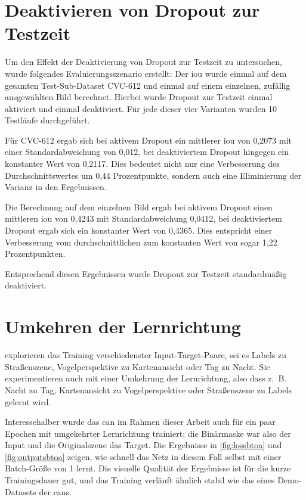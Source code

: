 \section{Deaktivieren von Dropout zur Testzeit}

Um den Effekt der Deaktivierung von Dropout zur Testzeit zu untersuchen, wurde folgendes Evaluierungsszenario erstellt:
Der \gls{iou} wurde einmal auf dem gesamten Test-Sub-Dataset CVC-612 und einmal auf einem einzelnen, zufällig ausgewählten Bild berechnet.
Hierbei wurde Dropout zur Testzeit einmal aktiviert und einmal deaktiviert.
Für jede dieser vier Varianten wurden 10 Testläufe durchgeführt.

Für CVC-612 ergab sich bei aktivem Dropout ein mittlerer \gls{iou} von 0,2073 mit einer Standardabweichung von 0,012, bei deaktiviertem Dropout hingegen ein konstanter Wert von 0,2117.
Dies bedeutet nicht nur eine Verbesserung des Durchschnittswertes um 0,44 Prozentpunkte, sondern auch eine Eliminierung der Varianz in den Ergebnissen.

Die Berechnung auf dem einzelnen Bild ergab bei aktivem Dropout einen mittleren \gls{iou} von 0,4243 mit Standardabweichung 0,0412, bei deaktiviertem Dropout ergab sich ein konstanter Wert von 0,4365.
Dies entspricht einer Verbesserung vom durchschnittlichen zum konstanten Wert von sogar 1,22 Prozentpunkten.

Entsprechend diesen Ergebnissen wurde Dropout zur Testzeit standardmäßig deaktiviert.



\section{Umkehren der Lernrichtung}

\citeauthor{Isola.2017} explorieren das Training verschiedenster Input-Target-Paare, sei es Labels zu Straßenszene, Vogelperspektive zu Kartenansicht oder Tag zu Nacht.
Sie experimentieren auch mit einer Umkehrung der Lernrichtung, also dass z.~B. Nacht zu Tag, Kartenansicht zu Vogelperspektive oder Straßenszene zu Labels gelernt wird.

Interessehalber wurde das \gls{can} im Rahmen dieser Arbeit auch für ein paar Epochen mit umgekehrter Lernrichtung trainiert; die Binärmaske war also der Input und die Originalszene das Target.
Die Ergebnisse in \autoref{fig:lossbtoa} und \autoref{fig:outputsbtoa} zeigen, wie schnell das Netz in diesem Fall selbst mit einer Batch-Größe von 1 lernt.
Die visuelle Qualität der Ergebnisse ist für die kurze Trainingsdauer gut, und das Training verläuft ähnlich stabil wie das eines Demo-Datasets der \glspl{can}.

